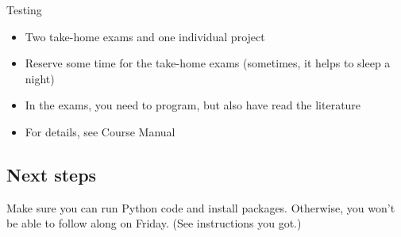 \begin{frame}{Testing}
\begin{itemize}
	\item Two take-home exams and one individual project
	\item Reserve some time for the take-home exams (sometimes, it helps to sleep a night)
	\item In the exams, you need to program, but also have read the literature
	\item For details, see Course Manual
\end{itemize}
\end{frame}


\subsection{Next steps}




\begin{frame}[standout]
	Make sure you can run Python code and install packages. Otherwise, you won't be able to follow along on Friday. (See instructions you got.)
\end{frame}


\begin{frame}
	\printbibliography
\end{frame}



